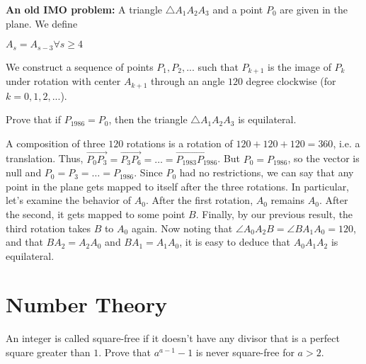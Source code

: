 \documentclass{subfile}
\begin{document}
	
	
	\begin{problem}
		\textbf{An old IMO problem:} A triangle $\triangle A_{1}A_{2}A_{3}$ and a point $P_{0}$ are given in the plane. We define
		
		\begin{center} $A_{s}=A_{s-3} \forall s\geq 4$ \end{center}
		
		We construct a sequence of points $P_{1},P_{2},...$ such that $P_{k+1}$ is the image of $P_{k}$ under rotation with center $A_{k+1}$ through an angle $120$ degree clockwise (for $k=0,1,2,...$).
		
		Prove that if $P_{1986}=P_{0}$, then the triangle $\triangle A_{1}A_{2}A_{3}$ is equilateral.
	\end{problem}
		
	\begin{solution}
	    A composition of three $ 120$ rotations is a rotation of $ 120 + 120 + 120 = 360$, i.e. a translation. Thus, $ \vec{P_0 P_3} = \vec{P_3 P_6} = \dots = \vec {P_{1983} P_{1986}}$. But $ P_0 = P_{1986}$, so the vector is null and $ P_0 = P_3 = \dots = P_{1986}$. Since $ P_0$ had no restrictions, we can say that any point in the plane gets mapped to itself after the three rotations. In particular, let's examine the behavior of $ A_0$. After the first rotation, $ A_0$ remains $ A_0$. After the second, it gets mapped to some point $ B$. Finally, by our previous result, the third rotation takes $ B$ to $ A_0$ again. Now noting that $ \angle A_0A_2B = \angle B A_1 A_0 = 120$, and that $ BA_2 = A_2 A_0$ and $ BA_1 = A_1 A_0$, it is easy to deduce that $ A_0A_1A_2$ is equilateral.
	\end{solution}	

	\newpage

		
		\section{Number Theory}
		
		\begin{problem}
			An integer is called square-free if it doesn't have any divisor that is a perfect square greater than $1$. Prove that $a^{a-1}-1$ is never square-free for $a>2$.
		\end{problem}
		
\end{document}

